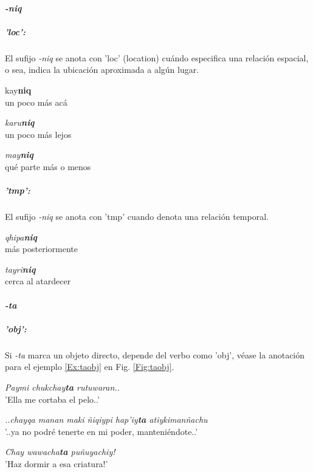 \documentclass[a4paper,11pt,DIV12]{scrartcl}
\begin{document}
\paragraph{{\em -niq}} 
\subparagraph{'loc':}
El sufijo {\em -niq} se anota con 'loc' (location) cu\'ando especifica una relaci\'on espacial, o sea, indica la ubicaci\'on aproximada a alg\'un lugar.
\begin{examples}
 \item {kay\textbf{niq}}\\
	un poco m\'as ac\'a
  \item {\em karu\textbf{niq}}\\
	un poco m\'as lejos
  \item {\em may\textbf{niq}}\\
	qu\'e parte m\'as o menos\\
    	 \hfill{\small \citep[220]{Cusi2}}
\end{examples}

\subparagraph{'tmp':} El sufijo {\em -niq} se anota con 'tmp' cuando denota una relaci\'on temporal.

\begin{examples}
 \item {\em qhipa\textbf{niq}}\\
      m\'as posteriormente
 \item {\em tayri\textbf{niq}}\\
      cerca al atardecer\\
    	 \hfill{\small \citep[220]{Cusi2}}
\end{examples}


\paragraph{{\em -ta}}
\subparagraph{'obj':} Si {\em -ta} marca un objeto directo, depende del verbo como 'obj', v\'ease la anotaci\'on para el ejemplo \ref{Ex:taobj} en Fig. \ref{Fig:taobj}.

\begin{examples}
 \item\label{Ex:taobj} {\em Paymi chukchay\textbf{ta} rutuwaran..}\\
	'Ella me cortaba el pelo..'
 \item\label{Ex:taclause} {\em ..chayqa manan maki ñiqiypi hap'iy\textbf{ta} atiykimanñachu}\\
      '..ya no podr\'e tenerte en mi poder, manteni\'endote..'\\
    	 \hfill{\small \citep{Valderrama77}}
 \item {\em Chay wawacha\textbf{ta} pu\~nuyachiy!}\\
	'{\textexclamdown}Haz dormir a esa criatura!'\\
    	 \hfill{\small \citep[120]{Cusi2}}
\end{examples}
\end{document}
